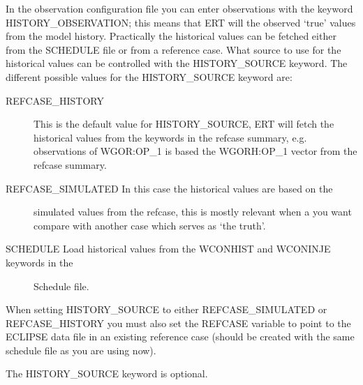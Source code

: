 \documentclass[letterpaper,10pt,english]{sphinxmanual}
\begin{document}
\begin{sphinxShadowBox}

In the observation configuration file you can enter
observations with the keyword HISTORY\_OBSERVATION; this means
that ERT will the observed ‘true’ values from the model
history. Practically the historical values can be fetched
either from the SCHEDULE file or from a reference case. What
source to use for the historical values can be controlled with
the HISTORY\_SOURCE keyword. The different possible values for
the HISTORY\_SOURCE keyword are:
\begin{description}
\item[{REFCASE\_HISTORY}] \leavevmode
This is the default value for HISTORY\_SOURCE,
ERT will fetch the historical values from the 
keywords in the refcase summary, e.g. observations of
WGOR:OP\_1 is based the WGORH:OP\_1 vector from the
refcase summary.

\item[{REFCASE\_SIMULATED In this case the historical values are based on the}] \leavevmode
simulated values from the refcase, this is mostly relevant when a you want
compare with another case which serves as ‘the truth’.

\item[{SCHEDULE Load historical values from the WCONHIST and WCONINJE keywords in the}] \leavevmode
Schedule file.

\end{description}

When setting HISTORY\_SOURCE to either REFCASE\_SIMULATED or REFCASE\_HISTORY you
must also set the REFCASE variable to point to the ECLIPSE data file in an
existing reference case (should be created with the same schedule file as you
are using now).


%
\begin{sphinxVerbatim}[commandchars=\\\{\}]
      
  
         
\end{sphinxVerbatim}

The HISTORY\_SOURCE keyword is optional.
\end{sphinxShadowBox}
\end{document}

